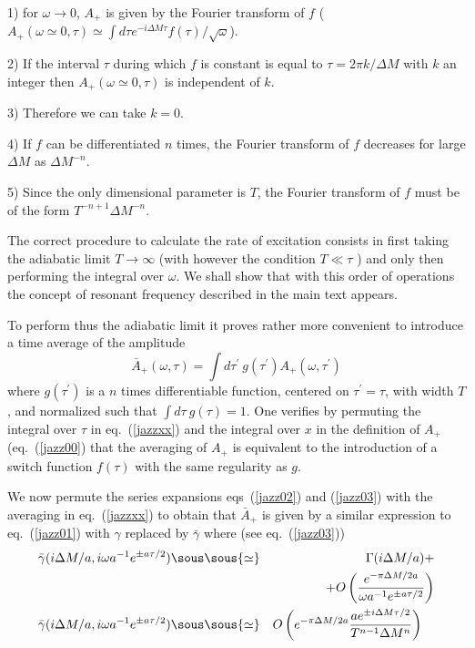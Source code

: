 \documentclass[12pt,oneside]{report}
\def\mettresous#1\sous#2{\mathrel{\mathop{\kern0pt #2}\limits_{#1}}}
\def\om{\omega	}
\begin{document}
1) for $\om \to
0$, $A_+$ is given by the Fourier transform of $f$ 
($A_+(\omega \simeq 0, \tau) \simeq \int d\tau e^{-i \Delta
M \tau} f(\tau) / \sqrt{\om}$). 

2) If the interval $\tau$
during which $f$ is constant is equal to $\tau = 2 \pi k /
\Delta M$ with $k$ an integer then $A_+(\om\simeq 0,\tau)$ is
independent of $k$. 

3) Therefore we can take $k=0$. 

4) If $f$
can be differentiated $n$ times, the Fourier transform of
$f$ decreases for large $\Delta M$ as $\Delta M ^{-n}$. 

5)
Since the only dimensional parameter is $T$, the Fourier
transform of $f$  must be of the form   $T^{-n+1} \Delta
M^{-n}$. 

\noindent The correct procedure to calculate
the rate of excitation consists in first taking the
adiabatic limit $T \to \infty$ (with however the condition
$T \ll \tau$ ) and only then
performing the integral over $\omega$. We shall show that
with this order of operations the concept of resonant
frequency described in the main text appears. 

To perform thus the adiabatic limit
it proves rather more convenient to introduce a time average of the amplitude
\begin{equation}
\bar A_+(\om,\tau) = \int\! d \tau^\prime
\ g(\tau^\prime) A_+(\om, \tau^\prime)\label{jazzxx}
\end{equation} 
where $g(\tau^\prime)$ is a $n$ times
differentiable function, centered on $\tau^\prime=\tau$, with width
$T$, and normalized such that $\int \! d\tau\ g(\tau) =1$.
One verifies by permuting the integral over $\tau$ in
eq.~(\ref{jazzxx}) and the integral over $x$ in the definition of
$A_+$ (eq.~(\ref{jazz00}) that the averaging of $A_+$ is
equivalent to the introduction of a switch function
$f(\tau)$ with the same regularity as $g$.

We now permute the series expansions eqs~(\ref{jazz02}) and
(\ref{jazz03}) with the averaging in eq.~(\ref{jazzxx}) to
obtain that $\bar A_+ $ is given by a similar
expression to eq.~(\ref{jazz01}) with $\gamma$ replaced by
$\bar \gamma $ where 
(see eq.~(\ref{jazz03}))
\begin{eqnarray}
\bar  \gamma (i\Delta M/a , i \omega a^{-1}
e^{\pm a \tau / 2})
&\mettresous{\frac{\omega 
e^{\pm a \tau / 2}}{a} \to \infty}\sous{\simeq}&
 \Gamma ( i\Delta M / a) + \nonumber\\
&\ &\!\!\!\!+ O\left({e^{- \pi \Delta M / 2a}
\over \omega a^{-1}
e^{\pm a \tau / 2} } \right)
\label{jazz04}
\\
\bar  \gamma (i\Delta M/a , i \omega a^{-1}
e^{\pm a \tau / 2})
&\mettresous{\frac{\omega 
e^{\pm a \tau / 2}}{a} \to 0}\sous{\simeq} &
 O\left(e^{- \pi \Delta M / 2a}
{a e^{\pm i\Delta M \tau/2} \over T^{n-1} \Delta M^n}\right) \quad 
\label{jazz05}
\end{eqnarray}
\end{document}
